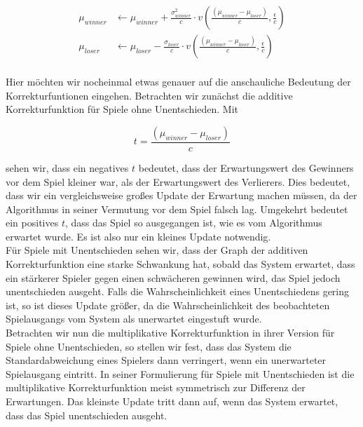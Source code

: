 \documentclass[12pt,a4paper]{scrartcl}
\numberwithin{equation}{section}
\begin{document}
  \begin{equation}
   \begin{split}
   \mu_{winner} &\leftarrow \mu_{winner} + \frac{\sigma_{winner}^2}{c} \cdot v (\frac{(\mu_{winner} - \mu_{loser})}{c}, \frac{\epsilon}{c}) \\
   \mu_{loser} &\leftarrow \mu_{loser} - \frac{ \sigma_{loser} }{c} \cdot v(\frac{(\mu_{winner} - \mu_{loser})}{c}, \frac{\epsilon}{c}) \\
  \end{split}
  \end{equation}
 
  Hier möchten wir nocheinmal etwas genauer auf die anschauliche Bedeutung der Korrekturfuntionen eingehen. 
  Betrachten wir zunächst die additive Korrekturfunktion für Spiele ohne Unentschieden. 
  Mit
  
  \begin{equation}
   t = \frac{ (\mu_{winner} - \mu_{loser}) }{c}
  \end{equation}

  sehen wir, dass ein negatives $t$ bedeutet, dass der Erwartungswert des Gewinners vor dem Spiel kleiner war, als der Erwartungswert des Verlierers. 
  Dies bedeutet, dass wir ein vergleichsweise großes Update der Erwartung machen müssen, da der Algorithmus in seiner Vermutung vor dem Spiel falsch lag. 
  Umgekehrt bedeutet ein positives $t$, dass das Spiel so ausgegangen ist, wie es vom Algorithmus erwartet wurde. Es ist also nur ein kleines Update notwendig. \\
  
  Für Spiele mit Unentschieden sehen wir, dass der Graph der additiven Korrekturfunktion eine starke Schwankung hat, sobald das System erwartet, dass ein stärkerer Spieler
  gegen einen schwächeren gewinnen wird, das Spiel jedoch unentschieden ausgeht. Falls die Wahrscheinlichkeit eines Unentschiedens gering ist, so ist dieses Update größer, da
  die Wahrscheinlichkeit des beobachteten Spielausgangs vom System als unerwartet eingestuft wurde. \\
  
  Betrachten wir nun die multiplikative Korrekturfunktion in ihrer Version für Spiele ohne Unentschieden, so stellen wir fest, dass das System die Standardabweichung eines Spielers
  dann verringert, wenn ein unerwarteter Spielausgang eintritt. In seiner Formulierung für Spiele mit Unentschieden ist die multiplikative Korrekturfunktion meist symmetrisch zur Differenz
  der Erwartungen. Das kleinste Update tritt dann auf, wenn das System erwartet, dass das Spiel unentschieden ausgeht. \\
  
\end{document}
